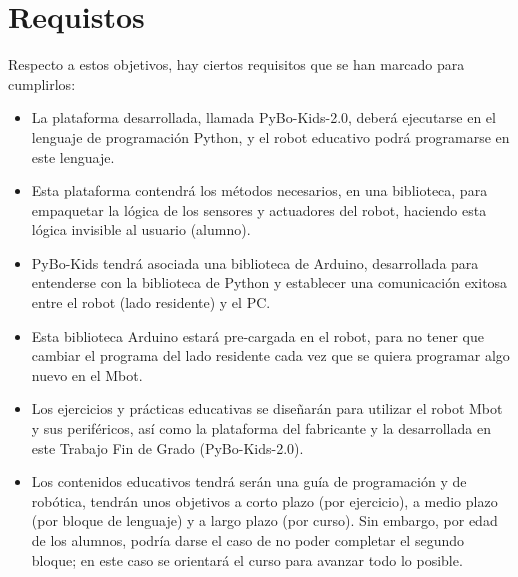 \section{Requistos}\label{sec:requisitos}
Respecto a estos objetivos, hay ciertos requisitos que se han marcado para cumplirlos:
\begin{itemize}
	\item La plataforma desarrollada, llamada PyBo-Kids-2.0, deberá ejecutarse en el lenguaje de programación Python, y el robot educativo podrá programarse en este lenguaje.
	\item Esta plataforma contendrá los métodos necesarios, en una biblioteca, para empaquetar la lógica de los sensores y actuadores del robot, haciendo esta lógica invisible al usuario (alumno).
	\item PyBo-Kids tendrá asociada una biblioteca de Arduino, desarrollada para entenderse con la biblioteca de Python y establecer una comunicación exitosa entre el robot (lado residente) y el PC. 
	\item Esta biblioteca Arduino estará pre-cargada en el robot, para no tener que cambiar el programa del lado residente cada vez que se quiera programar algo nuevo en el Mbot.
	\item Los ejercicios y prácticas educativas se diseñarán para utilizar el robot Mbot y sus periféricos, así como la plataforma del fabricante y la desarrollada en este Trabajo Fin de Grado (PyBo-Kids-2.0).
	\item Los contenidos educativos tendrá serán una guía de programación y de robótica, tendrán unos objetivos a corto plazo (por ejercicio), a medio plazo (por bloque de lenguaje) y a largo plazo (por curso). Sin embargo, por edad de los alumnos, podría darse el caso de no poder completar el segundo bloque; en este caso se orientará el curso para avanzar todo lo posible.	  
\end{itemize}

